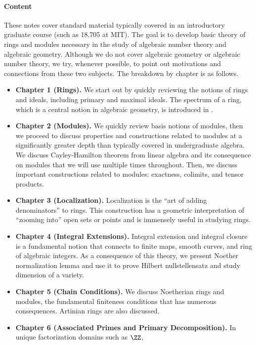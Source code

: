 \paragraph{Content}
These notes cover standard material typically covered in an introductory graduate course (such as 18.705 at MIT).
The goal is to develop basic theory of rings and modules
necessary in the study of algebraic number theory 
and algebraic geometry. 
Although we do not cover algebraic geometry
or algebraic number theory,
we try, whenever possible, to point out motivations and 
connections from these two subjects.
The breakdown by chapter is as follows.
\begin{itemize}
    \item \textbf{Chapter 1 (Rings).} 
    We start out by quickly reviewing the notions of rings and ideals, including primary and maximal ideals.
    The spectrum of a ring, which is a central notion in algebraic geometry, is introduced in .
    \item \textbf{Chapter 2 (Modules).}
    We quickly review basis notions of modules,
    then we proceed to discuss properties and constructions related to modules at a significantly greater depth
    than typically covered in undergraduate algebra.
    We discuss Cayley-Hamilton theorem from linear algebra and its consequence on modules that we will use multiple times throughout.
    Then, we discuss important constructions related to modules: exactness, colimits, and tensor products.
    \item \textbf{Chapter 3 (Localization).}
    Localization is the ``art of adding denominators'' to rings. 
    This construction has a geometric interpretation of ``zooming into'' open sets or points
    and is immensely useful in studying rings.
    \item \textbf{Chapter 4 (Integral Extensions).}
    Integral extension and integral closure is a fundamental notion that connects to finite maps, smooth curves, and ring of algebraic integers.
    As a consequence of this theory, we present Noether normalization lemma and use it to prove Hilbert nullstellensatz and study dimension of a variety.
    \item \textbf{Chapter 5 (Chain Conditions).}
    We discuss Noetherian rings and modules, the fundamental finiteness conditions that has numerous consequences.
    Artinian rings are also discussed.
    \item \textbf{Chapter 6 (Associated Primes and 
    Primary Decomposition).}
    In unique factorization domains such as $\ZZ$,

\end{itemize}
